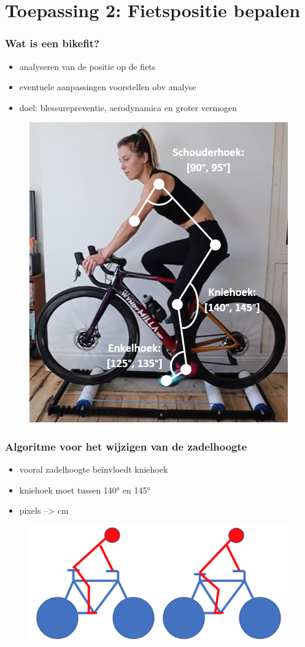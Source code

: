 \documentclass
   [kulak] %
   {kulakbeamer}
\begin{document}
\section{Toepassing 2: Fietspositie bepalen}

\begin{frame}
	\frametitle{Wat is een bikefit?}
	\begin{itemize}
		\item analyseren van de positie op de fiets
		\item eventuele aanpassingen voorstellen obv analyse
		\item doel: blessurepreventie, aerodynamica en groter vermogen
	\end{itemize}
\begin{figure}
	\includegraphics[width= .4\textwidth]{bikefit_hoeken_foto}
\end{figure}
\end{frame}

\begin{frame}
	\frametitle{Algoritme voor het wijzigen van de zadelhoogte}
	\begin{itemize}
		\item vooral zadelhoogte beïnvloedt kniehoek
		\item kniehoek moet tussen 140° en 145°
		\item pixels --> \si{cm}
	\end{itemize}
	\begin{figure}
		\includegraphics[width= \textwidth]{zadel.png}
	\end{figure}
\end{frame}
\end{document}
